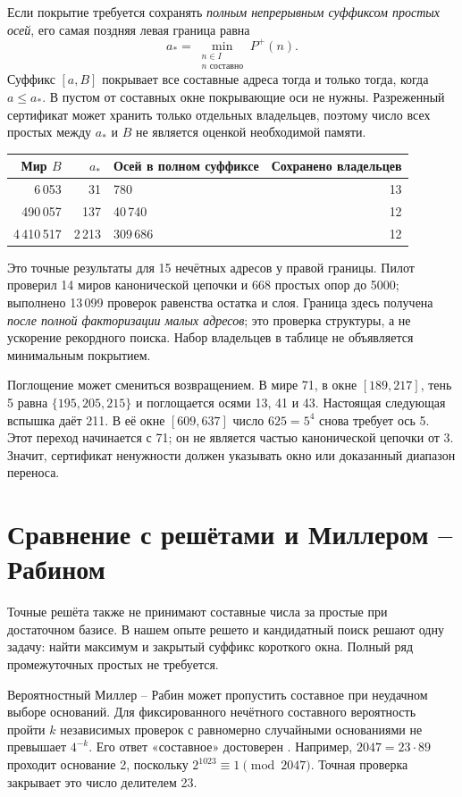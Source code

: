 \documentclass[11pt,a4paper]{article}
\begin{document}
Если покрытие требуется сохранять \emph{полным непрерывным суффиксом простых осей}, его самая поздняя левая граница равна
\[
 \boxed{a_* = \min_{\substack{n\in I\\n\text{ составно}}}P^+(n).}
\]
Суффикс $[a,B]$ покрывает все составные адреса тогда и только тогда, когда $a\le a_*$. В пустом от составных окне покрывающие оси не нужны. Разреженный сертификат может хранить только отдельных владельцев, поэтому число всех простых между $a_*$ и $B$ не является оценкой необходимой памяти.

\begin{center}
\begin{tabularx}{\linewidth}{@{}r r X r@{}}
\toprule
Мир $B$ & $a_*$ & Осей в полном суффиксе & Сохранено владельцев\\
\midrule
6\,053 & 31 & 780 & 13\\
490\,057 & 137 & 40\,740 & 12\\
4\,410\,517 & 2\,213 & 309\,686 & 12\\
\bottomrule
\end{tabularx}
\end{center}
Это точные результаты для 15 нечётных адресов у правой границы. Пилот проверил 14 миров канонической цепочки и 668 простых опор до 5000; выполнено 13\,099 проверок равенства остатка и слоя. Граница здесь получена \emph{после полной факторизации малых адресов}; это проверка структуры, а не ускорение рекордного поиска. Набор владельцев в таблице не объявляется минимальным покрытием.

Поглощение может смениться возвращением. В мире 71, в окне $[189,217]$, тень 5 равна $\{195,205,215\}$ и поглощается осями 13, 41 и 43. Настоящая следующая вспышка даёт 211. В её окне $[609,637]$ число $625=5^4$ снова требует ось 5. Этот переход начинается с 71; он не является частью канонической цепочки от 3. Значит, сертификат ненужности должен указывать окно или доказанный диапазон переноса.

\section{Сравнение с решётами и Миллером -- Рабином}

Точные решёта также не принимают составные числа за простые при достаточном базисе. В нашем опыте решето и кандидатный поиск решают одну задачу: найти максимум и закрытый суффикс короткого окна. Полный ряд промежуточных простых не требуется.

Вероятностный Миллер -- Рабин может пропустить составное при неудачном выборе оснований. Для фиксированного нечётного составного вероятность пройти $k$ независимых проверок с равномерно случайными основаниями не превышает $4^{-k}$. Его ответ «составное» достоверен \cite{hac}. Например, $2047=23\cdot89$ проходит основание 2, поскольку $2^{1023}\equiv1\pmod{2047}$. Точная проверка закрывает это число делителем 23.
\end{document}
